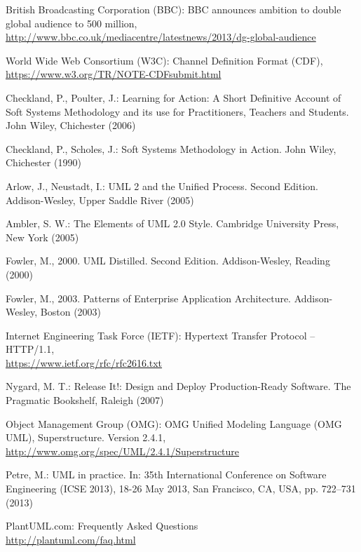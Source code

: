 \documentclass[runningheads,a4paper]{llncs}
\begin{document}
\begin{thebibliography}{}

 British Broadcasting Corporation (BBC): BBC announces ambition to double global audience to 500 million,\\
\url{http://www.bbc.co.uk/mediacentre/latestnews/2013/dg-global-audience}

 World Wide Web Consortium (W3C): Channel Definition Format (CDF),\\
\url{https://www.w3.org/TR/NOTE-CDFsubmit.html}

 Checkland, P., Poulter, J.: Learning for Action: A Short Definitive Account of Soft Systems Methodology and its use for Practitioners, Teachers and Students. John Wiley, Chichester (2006)

 Checkland, P., Scholes, J.: Soft Systems Methodology in Action. John Wiley, Chichester (1990)

 Arlow, J., Neustadt, I.: UML 2 and the Unified Process. Second Edition. Addison-Wesley, Upper Saddle River (2005)

 Ambler, S. W.: The Elements of UML 2.0 Style. Cambridge University Press, New York (2005)

 Fowler, M., 2000. UML Distilled. Second Edition. Addison-Wesley, Reading (2000)

 Fowler, M., 2003. Patterns of Enterprise Application Architecture. Addison-Wesley, Boston (2003)

 Internet Engineering Task Force (IETF): Hypertext Transfer Protocol -- HTTP/1.1,\\
\url{https://www.ietf.org/rfc/rfc2616.txt}

 Nygard, M. T.: Release It!: Design and Deploy Production-Ready Software. The Pragmatic Bookshelf, Raleigh (2007)

 Object Management Group (OMG): OMG Unified Modeling Language (OMG UML), Superstructure. Version 2.4.1,\\
\url{http://www.omg.org/spec/UML/2.4.1/Superstructure}

 Petre, M.: UML in practice. In: 35th International Conference on Software Engineering (ICSE 2013), 18-26 May 2013, San Francisco, CA, USA, pp. 722–731 (2013)

 PlantUML.com: Frequently Asked Questions\\
\url{http://plantuml.com/faq.html}


\end{thebibliography}
\end{document}
